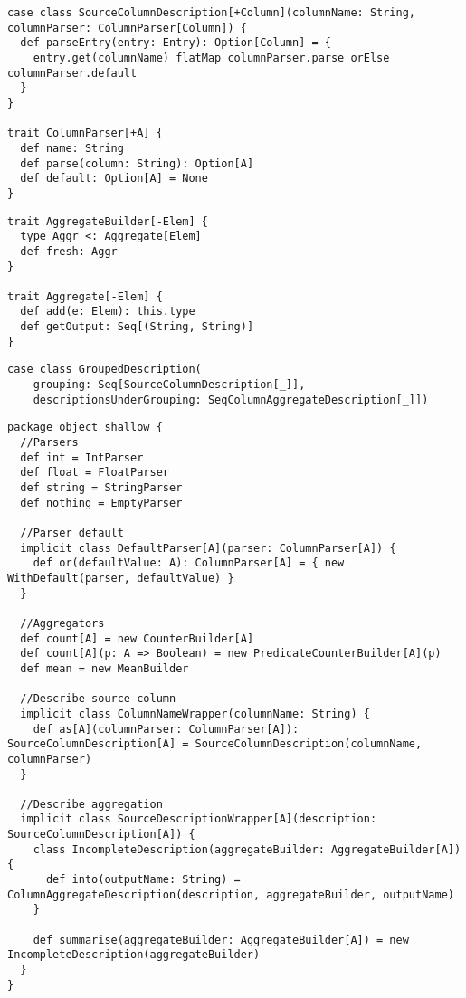 \begin{lstlisting}[caption=SourceColumnDescription, label=code:scd, float]
case class SourceColumnDescription[+Column](columnName: String, columnParser: ColumnParser[Column]) {
  def parseEntry(entry: Entry): Option[Column] = {
    entry.get(columnName) flatMap columnParser.parse orElse columnParser.default
  }
}

trait ColumnParser[+A] {
  def name: String
  def parse(column: String): Option[A]
  def default: Option[A] = None
}
\end{lstlisting}

\begin{lstlisting}[caption=Aggregate, label=code:agg, float]
trait AggregateBuilder[-Elem] {
  type Aggr <: Aggregate[Elem]
  def fresh: Aggr
}

trait Aggregate[-Elem] {
  def add(e: Elem): this.type
  def getOutput: Seq[(String, String)]
}
\end{lstlisting}

\begin{lstlisting}[caption=GroupedDescription, label=code:grouped, float]
case class GroupedDescription(
	grouping: Seq[SourceColumnDescription[_]],
	descriptionsUnderGrouping: SeqColumnAggregateDescription[_]])
\end{lstlisting}

\begin{lstlisting}[caption=shallow package object, label=code:shallow, float]
package object shallow {
  //Parsers
  def int = IntParser
  def float = FloatParser
  def string = StringParser
  def nothing = EmptyParser

  //Parser default
  implicit class DefaultParser[A](parser: ColumnParser[A]) {
    def or(defaultValue: A): ColumnParser[A] = { new WithDefault(parser, defaultValue) }
  }

  //Aggregators
  def count[A] = new CounterBuilder[A]
  def count[A](p: A => Boolean) = new PredicateCounterBuilder[A](p)
  def mean = new MeanBuilder

  //Describe source column
  implicit class ColumnNameWrapper(columnName: String) {
    def as[A](columnParser: ColumnParser[A]): SourceColumnDescription[A] = SourceColumnDescription(columnName, columnParser)
  }

  //Describe aggregation
  implicit class SourceDescriptionWrapper[A](description: SourceColumnDescription[A]) {
    class IncompleteDescription(aggregateBuilder: AggregateBuilder[A]) {
      def into(outputName: String) = ColumnAggregateDescription(description, aggregateBuilder, outputName)
    }

    def summarise(aggregateBuilder: AggregateBuilder[A]) = new IncompleteDescription(aggregateBuilder)
  }
}
\end{lstlisting}

